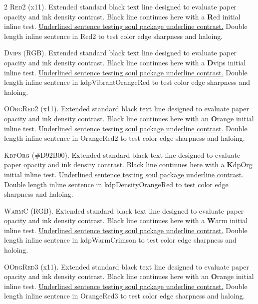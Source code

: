 \begin{multicols}{2}
\lettrine[lines=2]{\textcolor{Red2}{R}}{ed2} (x11). Extended standard black text line designed to evaluate paper opacity and ink density contrast. Black line continues here with a \textbf{\textcolor{Red2}{R}}ed initial inline test. \ul{Underlined sentence testing soul package underline contrast.} \textcolor{Red2}{Double length inline sentence in Red2 to test color edge sharpness and haloing.}


\lettrine[lines=2]{\textcolor{kdpVibrantOrangeRed}{D}}{vips} (RGB). Extended standard black text line designed to evaluate paper opacity and ink density contrast. Black line continues here with a \textbf{\textcolor{kdpVibrantOrangeRed}{D}}vips initial inline test. \ul{Underlined sentence testing soul package underline contrast.} \textcolor{kdpVibrantOrangeRed}{Double length inline sentence in kdpVibrantOrangeRed to test color edge sharpness and haloing.}


\lettrine[lines=2]{\textcolor{OrangeRed2}{O}}{OrgRed2} (x11). Extended standard black text line designed to evaluate paper opacity and ink density contrast. Black line continues here with an \textbf{\textcolor{OrangeRed2}{O}}range initial inline test. \ul{Underlined sentence testing soul package underline contrast.} \textcolor{OrangeRed2}{Double length inline sentence in OrangeRed2 to test color edge sharpness and haloing.}


\lettrine[lines=2]{\textcolor{kdpDensityOrangeRed}{K}}{dpOrg} (\#D92B00). Extended standard black text line designed to evaluate paper opacity and ink density contrast. Black line continues here with a \textbf{\textcolor{kdpDensityOrangeRed}{K}}dpOrg initial inline test. \ul{Underlined sentence testing soul package underline contrast.} \textcolor{kdpDensityOrangeRed}{Double length inline sentence in kdpDensityOrangeRed to test color edge sharpness and haloing.}


\lettrine[lines=2]{\textcolor{kdpWarmCrimson}{W}}{armC} (RGB). Extended standard black text line designed to evaluate paper opacity and ink density contrast. Black line continues here with a \textbf{\textcolor{kdpWarmCrimson}{W}}arm initial inline test. \ul{Underlined sentence testing soul package underline contrast.} \textcolor{kdpWarmCrimson}{Double length inline sentence in kdpWarmCrimson to test color edge sharpness and haloing.}


\lettrine[lines=2]{\textcolor{OrangeRed3}{O}}{OrgRed3} (x11). Extended standard black text line designed to evaluate paper opacity and ink density contrast. Black line continues here with an \textbf{\textcolor{OrangeRed3}{O}}range initial inline test. \ul{Underlined sentence testing soul package underline contrast.} \textcolor{OrangeRed3}{Double length inline sentence in OrangeRed3 to test color edge sharpness and haloing.}



\end{multicols}
